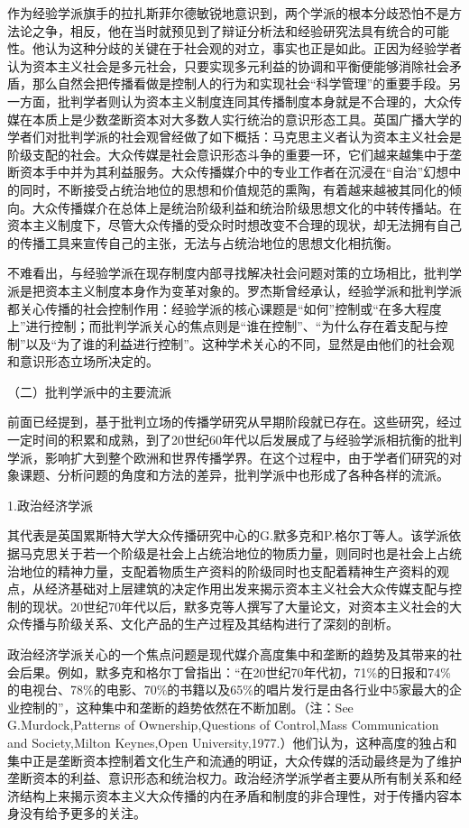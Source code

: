 \documentclass[UTF8,12pt]{ctexart}
\numberwithin{equation}{section} %
\numberwithin{figure}{section}
\numberwithin{table}{section}
\begin{document}
	作为经验学派旗手的拉扎斯菲尔德敏锐地意识到，两个学派的根本分歧恐怕不是方法论之争，相反，他在当时就预见到了辩证分析法和经验研究法具有统合的可能性。他认为这种分歧的关键在于社会观的对立，事实也正是如此。正因为经验学者认为资本主义社会是多元社会，只要实现多元利益的协调和平衡便能够消除社会矛盾，那么自然会把传播看做是控制人的行为和实现社会“科学管理”的重要手段。另一方面，批判学者则认为资本主义制度连同其传播制度本身就是不合理的，大众传媒在本质上是少数垄断资本对大多数人实行统治的意识形态工具。英国广播大学的学者们对批判学派的社会观曾经做了如下概括：马克思主义者认为资本主义社会是阶级支配的社会。大众传媒是社会意识形态斗争的重要一环，它们越来越集中于垄断资本手中并为其利益服务。大众传播媒介中的专业工作者在沉浸在“自治”幻想中的同时，不断接受占统治地位的思想和价值规范的熏陶，有着越来越被其同化的倾向。大众传播媒介在总体上是统治阶级利益和统治阶级思想文化的中转传播站。在资本主义制度下，尽管大众传播的受众时时想改变不合理的现状，却无法拥有自己的传播工具来宣传自己的主张，无法与占统治地位的思想文化相抗衡。
	
	不难看出，与经验学派在现存制度内部寻找解决社会问题对策的立场相比，批判学派是把资本主义制度本身作为变革对象的。罗杰斯曾经承认，经验学派和批判学派都关心传播的社会控制作用：经验学派的核心课题是“如何”控制或“在多大程度上”进行控制；而批判学派关心的焦点则是“谁在控制”、“为什么存在着支配与控制”以及“为了谁的利益进行控制”。这种学术关心的不同，显然是由他们的社会观和意识形态立场所决定的。
	
	（二）批判学派中的主要流派
	
	前面已经提到，基于批判立场的传播学研究从早期阶段就已存在。这些研究，经过一定时间的积累和成熟，到了20世纪60年代以后发展成了与经验学派相抗衡的批判学派，影响扩大到整个欧洲和世界传播学界。在这个过程中，由于学者们研究的对象课题、分析问题的角度和方法的差异，批判学派中也形成了各种各样的流派。
	
	1.政治经济学派
	
	其代表是英国累斯特大学大众传播研究中心的G.默多克和P.格尔丁等人。该学派依据马克思关于若一个阶级是社会上占统治地位的物质力量，则同时也是社会上占统治地位的精神力量，支配着物质生产资料的阶级同时也支配着精神生产资料的观点，从经济基础对上层建筑的决定作用出发来揭示资本主义社会大众传媒支配与控制的现状。20世纪70年代以后，默多克等人撰写了大量论文，对资本主义社会的大众传播与阶级关系、文化产品的生产过程及其结构进行了深刻的剖析。
	
	政治经济学派关心的一个焦点问题是现代媒介高度集中和垄断的趋势及其带来的社会后果。例如，默多克和格尔丁曾指出：“在20世纪70年代初，71\%的日报和74\%的电视台、78\%的电影、70\%的书籍以及65\%的唱片发行是由各行业中5家最大的企业控制的”，这种集中和垄断的趋势依然在不断加剧。（注：See G.Murdock,Patterns of Ownership,Questions of Control,Mass Communication and Society,Milton Keynes,Open University,1977.）他们认为，这种高度的独占和集中正是垄断资本控制着文化生产和流通的明证，大众传媒的活动最终是为了维护垄断资本的利益、意识形态和统治权力。政治经济学派学者主要从所有制关系和经济结构上来揭示资本主义大众传播的内在矛盾和制度的非合理性，对于传播内容本身没有给予更多的关注。
	
\end{document}

